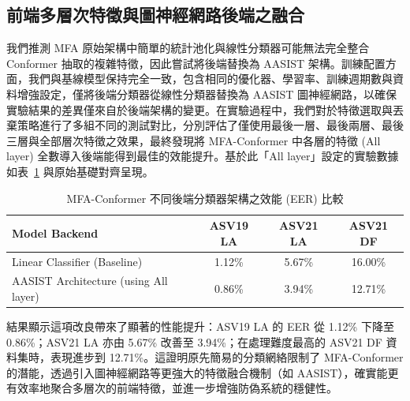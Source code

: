 \begin{table}[H]
\centering
\caption{MFA-Conformer 不同預訓練模型規模之參數與效能 (EER) 比較}
\label{tab:exp3_model_size}
\end{table}


\subsection{前端多層次特徵與圖神經網路後端之融合}
\label{subsec:backend_improvement}
我們推測 MFA 原始架構中簡單的統計池化與線性分類器可能無法完全整合 Conformer 抽取的複雜特徵，因此嘗試將後端替換為 AASIST 架構。訓練配置方面，我們與基線模型保持完全一致，包含相同的優化器、學習率、訓練週期數與資料增強設定，僅將後端分類器從線性分類器替換為 AASIST 圖神經網路，以確保實驗結果的差異僅來自於後端架構的變更。在實驗過程中，我們對於特徵選取與丟棄策略進行了多組不同的測試對比，分別評估了僅使用最後一層、最後兩層、最後三層與全部層次特徵之效果，最終發現將 MFA-Conformer 中各層的特徵 (All layer) 全數導入後端能得到最佳的效能提升。基於此「All layer」設定的實驗數據如表~\ref{tab:exp4_mfaconformer} 與原始基礎對齊呈現。

\begin{table}[H]
\centering
\caption{MFA-Conformer 不同後端分類器架構之效能 (EER) 比較}
\label{tab:exp4_mfaconformer}
\begin{tabular}{lccc}
\toprule
\textbf{Model Backend} & \textbf{ASV19 LA} & \textbf{ASV21 LA} & \textbf{ASV21 DF} \\
\midrule
Linear Classifier (Baseline) & 1.12\% & 5.67\% & 16.00\% \\
AASIST Architecture (using All layer) & 0.86\% & 3.94\% & 12.71\% \\
\bottomrule
\end{tabular}
\end{table}

結果顯示這項改良帶來了顯著的性能提升：ASV19 LA 的 EER 從 1.12\% 下降至 0.86\%；ASV21 LA 亦由 5.67\% 改善至 3.94\%；在處理難度最高的 ASV21 DF 資料集時，表現進步到 12.71\%。這證明原先簡易的分類網絡限制了 MFA-Conformer 的潛能，透過引入圖神經網路等更強大的特徵融合機制（如 AASIST），確實能更有效率地聚合多層次的前端特徵，並進一步增強防偽系統的穩健性。